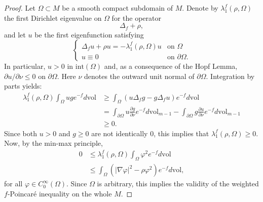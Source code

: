 \documentclass[11pt, leqno]{amsart}
\begin{document}
\begin{proof}
Let $\Omega\subset M$ be a smooth compact subdomain of $M$. Denote by $\lambda_1^f(\rho,\Omega)$ the first Dirichlet eigenvalue on $\Omega$ for the operator
\[
\Delta_f+\rho,
\] 
and let $u$ be the first eigenfunction satisfying
\[
\begin{cases}
\Delta_f u+\rho u=-\lambda_1^f(\rho,\Omega) u & \textrm{on } \Omega\\
u\equiv 0 & \textrm{on } \partial \Omega.
\end{cases}
\]
In particular, $u>0$ in $\mathrm{int}(\Omega)$ and, as a consequence of the Hopf Lemma, $\partial u/\partial \nu\leq 0$ on $\partial \Omega$. Here $\nu$ denotes the outward unit normal of $\partial \Omega$. Integration by parts yields:
\begin{align*}
\lambda_1^f(\rho,\Omega) \int_\Omega ug e^{-f}d\mathrm{vol}& \geq \int_\Omega(u\Delta_f g-g\Delta_f u) e^{-f}d\mathrm{vol}\\
&= \int_{\partial \Omega} u\frac{\partial g}{\partial \nu} e^{-f}d\mathrm{vol}_{m-1}-
 \int_{\partial \Omega} g\frac{\partial u}{\partial \nu} e^{-f}d\mathrm{vol}_{m-1}\\
 &\geq 0.
 \end{align*}
 Since both $u>0$ and $g\geq 0$ are not identically $0$, this implies that $\lambda_1^f(\rho,\Omega)\geq 0$. Now, by the min-max principle,
 \begin{align*}
 0 &\leq \lambda_1^f(\rho,\Omega)\int_\Omega \varphi^2 e^{-f}d\mathrm{vol}\\
 &\leq \int_\Omega \left(|\nabla \varphi|^2-\rho \varphi^2\right) e^{-f}d\mathrm{vol},
 \end{align*}
 for all $\varphi\in C^{\infty}_0(\Omega)$. Since $\Omega $ is arbitrary, this implies the validity of the weighted $f$-Poincar\'e inequality on the whole $M$.
\end{proof}
\end{document}
